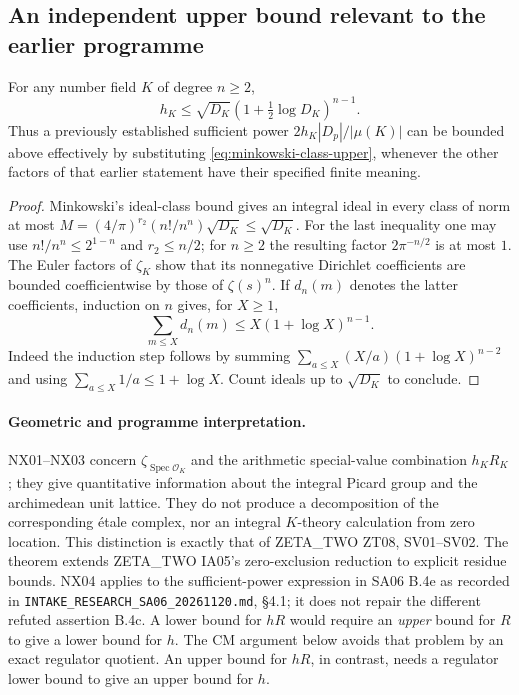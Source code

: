 \subsection{An independent upper bound relevant to the earlier programme}

\begin{proposition}
\label{NX04}
For any number field $K$ of degree $n\geq2$,
\begin{equation}\label{eq:minkowski-class-upper}
 h_K\leq\sqrt{D_K}\left(1+\tfrac12\log D_K\right)^{n-1}.
\end{equation}
Thus a previously established sufficient power
$2h_K|D_p|/|\mu(K)|$ can be bounded above effectively by substituting
\eqref{eq:minkowski-class-upper}, whenever the other factors of that
earlier statement have their specified finite meaning.
\end{proposition}

\begin{proof}
Minkowski's ideal-class bound \cite[Theorem~4.3, p.~70]{MilneANT} gives an integral ideal in every class
of norm at most
$M=(4/\pi)^{r_2}(n!/n^n)\sqrt{D_K}\leq\sqrt{D_K}$.
For the last inequality one may use $n!/n^n\leq2^{1-n}$ and
$r_2\leq n/2$; for $n\geq2$ the resulting factor
$2\pi^{-n/2}$ is at most $1$.
The Euler factors of $\zeta_K$ show that its nonnegative Dirichlet
coefficients are bounded coefficientwise by those of $\zeta(s)^n$.
If $d_n(m)$ denotes the latter coefficients, induction on $n$ gives,
for $X\geq1$,
\[
 \sum_{m\leq X}d_n(m)\leq X(1+\log X)^{n-1}.
\]
Indeed the induction step follows by summing
$\sum_{a\leq X}(X/a)(1+\log X)^{n-2}$ and using
$\sum_{a\leq X}1/a\leq1+\log X$.
Count ideals up to $\sqrt{D_K}$ to conclude.
\end{proof}

\paragraph{Geometric and programme interpretation.}
NX01--NX03 concern $\zeta_{\operatorname{Spec}\mathcal O_K}$ and the
arithmetic special-value combination $h_KR_K$; they give quantitative
information about the integral Picard group and the archimedean unit
lattice. They do not produce a decomposition of the corresponding
\'{e}tale complex, nor an integral $K$-theory calculation from zero
location. This distinction is exactly that of ZETA\_TWO ZT08, SV01--SV02.
The theorem extends ZETA\_TWO IA05's zero-exclusion reduction to explicit
residue bounds. NX04 applies to the sufficient-power expression in
SA06 B.4e as recorded in \texttt{INTAKE\_RESEARCH\_SA06\_20261120.md},
\S4.1; it does not repair the different refuted assertion B.4c.
A lower bound for $hR$ would require an \emph{upper} bound for $R$ to
give a lower bound for $h$. The CM argument below avoids that problem
by an exact regulator quotient. An upper bound for $hR$, in contrast,
needs a regulator lower bound to give an upper bound for $h$.

